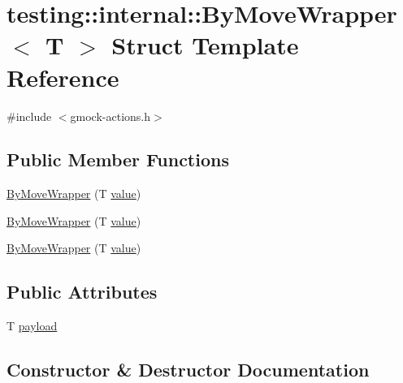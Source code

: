 \hypertarget{structtesting_1_1internal_1_1_by_move_wrapper}{}\section{testing\+::internal\+::By\+Move\+Wrapper$<$ T $>$ Struct Template Reference}
\label{structtesting_1_1internal_1_1_by_move_wrapper}


{\ttfamily \#include $<$gmock-\/actions.\+h$>$}

\subsection*{Public Member Functions}
\begin{DoxyCompactItemize}
\item 
\mbox{\hyperlink{structtesting_1_1internal_1_1_by_move_wrapper_a60df33395785e0bfc5f72fba32376349}{By\+Move\+Wrapper}} (T \mbox{\hyperlink{_obj__test_2lib_2googletest-master_2googlemock_2test_2gmock-matchers__test_8cc_a337b8a670efc0b086ad3af163f3121b6}{value}})
\item 
\mbox{\hyperlink{structtesting_1_1internal_1_1_by_move_wrapper_a60df33395785e0bfc5f72fba32376349}{By\+Move\+Wrapper}} (T \mbox{\hyperlink{_obj__test_2lib_2googletest-master_2googlemock_2test_2gmock-matchers__test_8cc_a337b8a670efc0b086ad3af163f3121b6}{value}})
\item 
\mbox{\hyperlink{structtesting_1_1internal_1_1_by_move_wrapper_a60df33395785e0bfc5f72fba32376349}{By\+Move\+Wrapper}} (T \mbox{\hyperlink{_obj__test_2lib_2googletest-master_2googlemock_2test_2gmock-matchers__test_8cc_a337b8a670efc0b086ad3af163f3121b6}{value}})
\end{DoxyCompactItemize}
\subsection*{Public Attributes}
\begin{DoxyCompactItemize}
\item 
T \mbox{\hyperlink{structtesting_1_1internal_1_1_by_move_wrapper_ae8407b1ae99db3f00797d68b9ee9e870}{payload}}
\end{DoxyCompactItemize}


\subsection{Constructor \& Destructor Documentation}
\mbox{\label{structtesting_1_1internal_1_1_by_move_wrapper_a60df33395785e0bfc5f72fba32376349}} 
